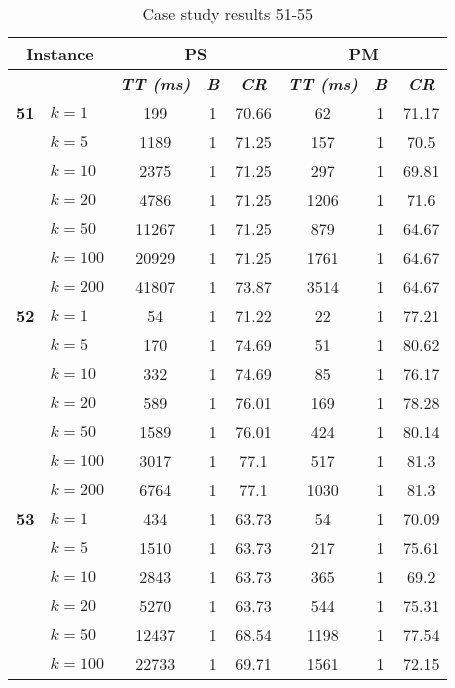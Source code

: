     \begin{table}[htbp]
    \caption{Case study results 51-55}
    \centering
    \begin{tabular}{|l|l|c|c|c|c|c|c|}
    \hline
    \multicolumn{ 2}{|c|}{\textbf{Instance}} & \multicolumn{ 3}{c|}{\textbf{PS}} & \multicolumn{ 3}{c|}{\textbf{PM}} \\ \hline
    \multicolumn{ 2}{|l|}{} & \textbf{\textit{TT (ms)}} & \textbf{\textit{B}} & \textbf{\textit{CR}} & \textbf{\textit{TT (ms)}} & \textbf{\textit{B}} & \textbf{\textit{CR}} \\ \hline
    \multicolumn{1}{|r|}{\textbf{51}} & $k=1$ & 199 & 1 & 70.66 & 62 & 1 & 71.17 \\ 
     & $k=5$ & 1189 & 1 & 71.25 & 157 & 1 & 70.5 \\ 
     & $k=10$ & 2375 & 1 & 71.25 & 297 & 1 & 69.81 \\ 
     & $k=20$ & 4786 & 1 & 71.25 & 1206 & 1 & 71.6 \\ 
     & $k=50$ & 11267 & 1 & 71.25 & 879 & 1 & 64.67 \\ 
     & $k=100$ & 20929 & 1 & 71.25 & 1761 & 1 & 64.67 \\ 
     & $k=200$ & 41807 & 1 & 73.87 & 3514 & 1 & 64.67 \\ \hline
    \multicolumn{1}{|r|}{\textbf{52}} & $k=1$ & 54 & 1 & 71.22 & 22 & 1 & 77.21 \\ 
     & $k=5$ & 170 & 1 & 74.69 & 51 & 1 & 80.62 \\ 
     & $k=10$ & 332 & 1 & 74.69 & 85 & 1 & 76.17 \\ 
     & $k=20$ & 589 & 1 & 76.01 & 169 & 1 & 78.28 \\ 
     & $k=50$ & 1589 & 1 & 76.01 & 424 & 1 & 80.14 \\ 
     & $k=100$ & 3017 & 1 & 77.1 & 517 & 1 & 81.3 \\ 
     & $k=200$ & 6764 & 1 & 77.1 & 1030 & 1 & 81.3 \\ \hline
    \multicolumn{1}{|r|}{\textbf{53}} & $k=1$ & 434 & 1 & 63.73 & 54 & 1 & 70.09 \\ 
     & $k=5$ & 1510 & 1 & 63.73 & 217 & 1 & 75.61 \\ 
     & $k=10$ & 2843 & 1 & 63.73 & 365 & 1 & 69.2 \\ 
     & $k=20$ & 5270 & 1 & 63.73 & 544 & 1 & 75.31 \\ 
     & $k=50$ & 12437 & 1 & 68.54 & 1198 & 1 & 77.54 \\ 
     & $k=100$ & 22733 & 1 & 69.71 & 1561 & 1 & 72.15 \\ 

\end{tabular}
\end{table}
